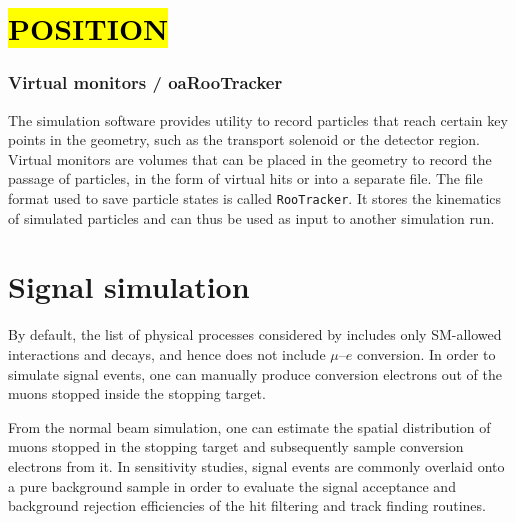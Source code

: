 \section{\hl{POSITION}}

\subsubsection{Virtual monitors / oaRooTracker}
The simulation software provides utility to record particles that reach certain key points in the geometry, such as the transport solenoid or the detector region. Virtual monitors are volumes that can be placed in the geometry to record the passage of particles, in the form of virtual hits or into a separate file. The file format used to save particle states is called \texttt{RooTracker}. It stores the kinematics of simulated particles and can thus be used as input to another simulation run. %




\section{Signal simulation}
By default, the list of physical processes considered by \SimG includes only SM-allowed interactions and decays, and hence does not include $\mu$--$e$ conversion. In order to simulate signal events, one can manually produce conversion electrons out of the muons stopped inside the stopping target.

From the normal beam simulation, one can estimate the spatial distribution of muons stopped in the stopping target and subsequently sample conversion electrons from it. In sensitivity studies, signal events are commonly overlaid onto a pure background sample in order to evaluate the signal acceptance and background rejection efficiencies of the hit filtering and track finding routines. %

